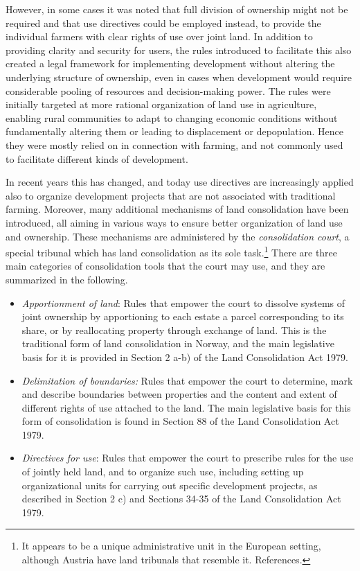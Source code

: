 However, in some cases it was noted that full division of ownership might not be required and that use directives could be employed instead, to provide the individual farmers with clear rights of use over joint land. In addition to providing clarity and security for users, the rules introduced to facilitate this also created a legal framework for implementing development without altering the underlying structure of ownership, even in cases when development would require considerable pooling of resources and decision-making power. The rules were initially targeted at more rational organization of land use in agriculture, enabling rural communities to adapt to changing economic conditions without fundamentally altering them or leading to displacement or depopulation. Hence they were mostly relied on in connection with farming, and not commonly used to facilitate different kinds of development.

In recent years this has changed, and today use directives are increasingly applied also to organize development projects that are not associated with traditional farming. Moreover, many additional mechanisms of land consolidation have been introduced, all aiming in various ways to ensure better organization of land use and ownership. These mechanisms are administered by the \emph{consolidation court}, a special tribunal which has land consolidation as its sole task.\footnote{It appears to be a unique administrative unit in the European setting, although Austria have land tribunals that resemble it. References.} There are three main categories of consolidation tools that the court may use, and they are summarized in the following.

\begin{itemize}
\item \emph{Apportionment of land}: Rules that empower the court to dissolve systems of joint ownership by apportioning to each estate a parcel corresponding to its share, or by reallocating property through exchange of land. This is the traditional form of land consolidation in Norway, and the main legislative basis for it is provided in Section 2 a-b) of the Land Consolidation Act 1979.
\item \emph{Delimitation of boundaries:} Rules that empower the court to determine, mark and describe boundaries between properties and the content and extent of different rights of use attached to the land. The main legislative basis for this form of consolidation is found in Section 88 of the Land Consolidation Act 1979.
\item \emph{Directives for use}: Rules that empower the court to prescribe rules for the use of jointly held land, and to organize such use, including setting up organizational units for carrying out specific development projects, as described in Section 2 c) and Sections 34-35 of the Land Consolidation Act 1979. 
\end{itemize}

